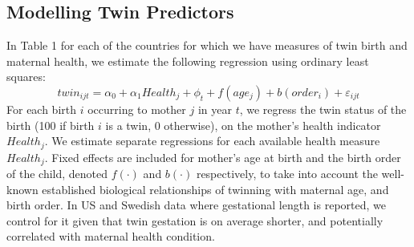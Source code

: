 \documentclass{nature}
\begin{document}
\begin{linenumbers}

\subsection{Modelling Twin Predictors}


In Table 1 for each of the countries for which we have measures of twin birth and maternal health, we estimate the following regression using ordinary least squares:
\begin{equation}
  twin_{ijt}=\alpha_0 + \alpha_1 Health_j + \phi_t + f(age_j) + b(order_i) + \varepsilon_{ijt}
\end{equation}
For each birth $i$ occurring to mother $j$ in year $t$, we regress the twin status of the birth (100 if birth $i$ is a twin, 0 otherwise), on the mother's health indicator $Health_j$. We estimate separate regressions for each available health measure $Health_j$. Fixed effects are included for mother's age at birth and the birth order of the child, denoted $f(\cdot)$ and $b(\cdot)$ respectively, to take into account the well-known established biological relationships of twinning with maternal age, and birth order. In US and Swedish data where gestational length is reported, we control for it given that twin gestation is on average shorter, and potentially correlated with maternal health condition\cite{Morrison2005}.  


\end{linenumbers}
\end{document}

